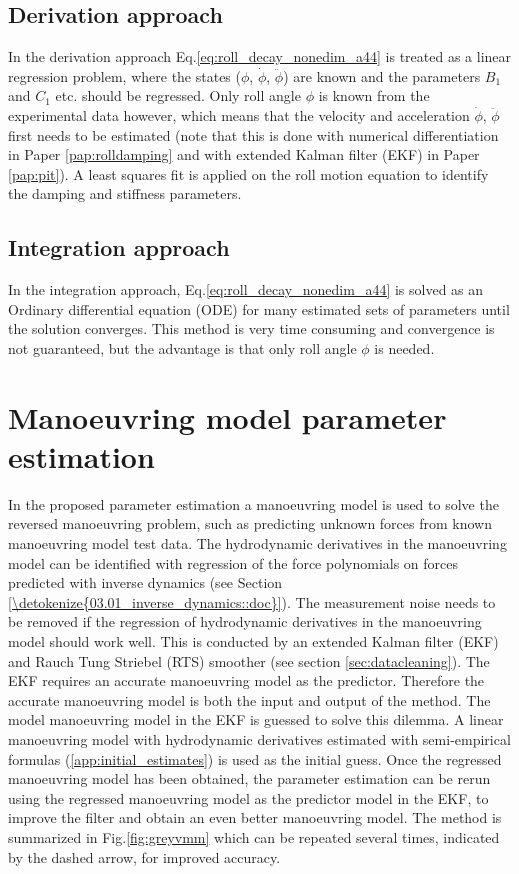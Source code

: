 \subsection{Derivation approach}\label{sec:derivation_approach}
In the derivation approach Eq.\ref{eq:roll_decay_nonedim_a44} is treated as a linear regression problem, where the states ($\phi$, $\dot{\phi}$, $\ddot{\phi}$) are known and the parameters $B_1$ and $C_1$ etc. should be regressed. Only roll angle $\phi$ is known from the experimental data however, which means that the velocity and acceleration $\dot{\phi}$, $\ddot{\phi}$ first needs to be estimated (note that this is done with numerical differentiation in Paper \ref{pap:rolldamping} and with extended Kalman filter (EKF) in Paper \ref{pap:pit}).
A least squares fit is applied on the roll motion equation to identify the damping and stiffness parameters.

\subsection{Integration approach}\label{sec:integration_approach}
In the integration approach, Eq.\ref{eq:roll_decay_nonedim_a44} is solved as an Ordinary differential equation (ODE) for many estimated sets of parameters until the solution converges. This method is very time consuming and convergence is not guaranteed, but the advantage is that only roll angle $\phi$ is needed.

\section{Manoeuvring model parameter estimation} \label{sec:_VMM}
In the proposed parameter estimation a manoeuvring model is used to solve the reversed manoeuvring problem, such as predicting unknown forces from known manoeuvring model test data. The hydrodynamic derivatives in the manoeuvring model can be identified with regression of the force polynomials on forces predicted with inverse dynamics (see Section \ref{\detokenize{03.01_inverse_dynamics::doc}}).
The measurement noise needs to be removed if the regression of hydrodynamic derivatives in the manoeuvring model should work well. This is conducted by an extended Kalman filter (EKF) and Rauch Tung Striebel (RTS) smoother (see section \ref{sec:datacleaning}). The EKF requires an accurate manoeuvring model as the predictor.
Therefore the accurate manoeuvring model is both the input and output of the method. The model manoeuvring model in the EKF is guessed to solve this dilemma. A linear manoeuvring model with hydrodynamic derivatives estimated with semi-empirical formulas (\autoref{app:initial_estimates}) is used as the initial guess. Once the regressed manoeuvring model has been obtained, the parameter estimation can be rerun using the regressed manoeuvring model as the predictor  model in the EKF, to improve the filter and obtain an even better manoeuvring model. The method is summarized in Fig.\ref{fig:greyvmm} which can be repeated several times, indicated by the dashed arrow, for improved accuracy. 

